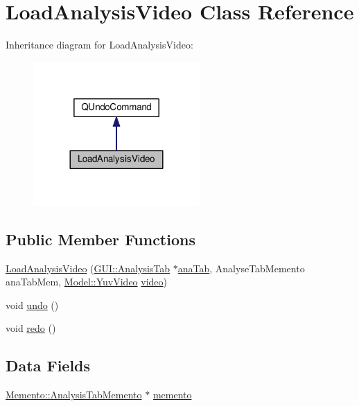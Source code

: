 \hypertarget{classUndoRedo_1_1LoadAnalysisVideo}{}\section{Load\+Analysis\+Video Class Reference}
\label{classUndoRedo_1_1LoadAnalysisVideo}


Inheritance diagram for Load\+Analysis\+Video\+:
\nopagebreak
\begin{figure}[H]
\begin{center}
\leavevmode
\includegraphics[width=180pt]{classUndoRedo_1_1LoadAnalysisVideo__inherit__graph}
\end{center}
\end{figure}
\subsection*{Public Member Functions}
\begin{DoxyCompactItemize}
\item 
\hyperlink{classUndoRedo_1_1LoadAnalysisVideo_ae34179e8d6121bb4cbe36e1cad9a829f}{Load\+Analysis\+Video} (\hyperlink{classGUI_1_1AnalysisTab}{G\+U\+I\+::\+Analysis\+Tab} $\ast$\hyperlink{classUndoRedo_1_1LoadAnalysisVideo_a7873b9caa261d4d8f973627c7ee4008e}{ana\+Tab}, Analyse\+Tab\+Memento ana\+Tab\+Mem, \hyperlink{classModel_1_1YuvVideo}{Model\+::\+Yuv\+Video} \hyperlink{classUndoRedo_1_1LoadAnalysisVideo_a17d20420106e047a53677d26c8db0d48}{video})
\item 
void \hyperlink{classUndoRedo_1_1LoadAnalysisVideo_a0e1e7804a53f6d62efc72c9bdbec8571}{undo} ()
\item 
void \hyperlink{classUndoRedo_1_1LoadAnalysisVideo_a93c48d6ed036e1a381be53ac67643284}{redo} ()
\end{DoxyCompactItemize}
\subsection*{Data Fields}
\begin{DoxyCompactItemize}
\item 
\hyperlink{classMemento_1_1AnalysisTabMemento}{Memento\+::\+Analysis\+Tab\+Memento} $\ast$ \hyperlink{classUndoRedo_1_1LoadAnalysisVideo_a56e13226ed93b1cf23903379eb5d89cb}{memento}
\end{DoxyCompactItemize}
